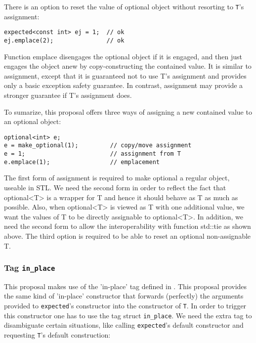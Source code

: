 \documentclass[a4paper,10pt]{article}
\newcommand{\cpp}[1]{\lstinline{#1}}
\begin{document}
There is an option to reset the value of optional object without resorting to \cpp{T}'s assignment:

\begin{lstlisting}
expected<const int> ej = 1;  // ok
ej.emplace(2);               // ok 
\end{lstlisting}

Function emplace disengages the optional object if it is engaged, and then just engages the object anew by copy-constructing the contained value. It is similar to assignment, except that it is guaranteed not to use T's assignment and provides only a basic exception safety guarantee. In contrast, assignment may provide a stronger guarantee if T's assignment does.

To sumarize, this proposal offers three ways of assigning a new contained value to an optional object:

\begin{lstlisting}
optional<int> e;
e = make_optional(1);         // copy/move assignment
e = 1;                        // assignment from T
e.emplace(1);                 // emplacement 
\end{lstlisting}

The first form of assignment is required to make optional a regular object, useable in STL. We need the second form in order to reflect the fact that optional<T> is a wrapper for T and hence it should behave as T as much as possible. Also, when optional<T> is viewed as T with one additional value, we want the values of T to be directly assignable to optional<T>. In addition, we need the second form to allow the interoperability with function std::tie as shown above. The third option is required to be able to reset an optional non-assignable T.

\subsubsection{Tag \cpp{in_place}}

This proposal makes use of the 'in-place' tag defined in \cite{OptionalRev5}. This proposal  provides the same kind of 'in-place' constructor that forwards (perfectly) the arguments provided to \cpp{expected}'s constructor into the constructor of \cpp{T}. In order to trigger this constructor one has to use the tag struct \cpp{in_place}. We need the extra tag to disambiguate certain situations, like calling \cpp{expected}'s default constructor and requesting \cpp{T}'s default construction:
\end{document}
